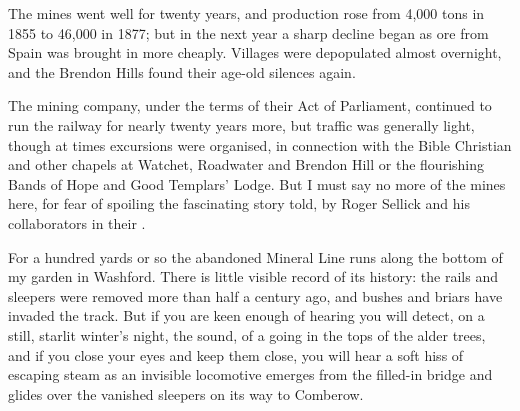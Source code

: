 The mines went well for twenty years, and production rose from 4,000 tons in 1855 to 46,000 in 1877; but in the next year a sharp decline began as ore from Spain was brought in more cheaply. Villages were depopulated almost overnight, and the Brendon Hills found their age-old silences again.

The mining company, under the terms of their Act of Parliament, continued to run the railway for nearly twenty years more, but traffic was generally light, though at times excursions were organised, in connection with the Bible Christian and other chapels at Watchet, Roadwater and Brendon Hill or the flourishing Bands of Hope and Good Templars' Lodge. But I must say no more of the mines here, for fear of spoiling the fascinating story told, by Roger Sellick and his collaborators in their .
 
\Flourish 

\newpage 
For a hundred yards or so the abandoned Mineral Line runs along the bottom of my garden in Washford. There is little visible record of its history: the rails and sleepers were removed more than half a century ago, and bushes and briars have invaded the track. But if you are keen enough of hearing you will detect, on a still, starlit winter’s night, the sound, of a going in the tops of the alder trees, and if you close your eyes and keep them close, you will hear a soft hiss of escaping steam as an invisible locomotive emerges from the filled-in bridge and glides over the vanished sleepers on its way to Comberow.